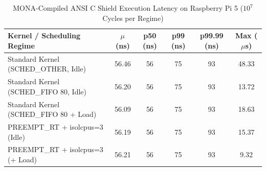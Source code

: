 \begin{table}[t]
\centering
\caption{MONA-Compiled ANSI C Shield Execution Latency on Raspberry Pi 5 ($10^7$ Cycles per Regime)}
\label{tab:c_shield_rt}
\begin{tabular}{lccccc}
\toprule
\textbf{Kernel / Scheduling Regime} & \textbf{$\mu$ (ns)} & \textbf{p50 (ns)} & \textbf{p99 (ns)} & \textbf{p99.99 (ns)} & \textbf{Max ($\mu$s)} \\
\midrule
Standard Kernel (SCHED\_OTHER, Idle) & 56.46 & 56 & 75 & 93 & 48.33 \\
Standard Kernel (SCHED\_FIFO 80, Idle) & 56.20 & 56 & 75 & 93 & 13.72 \\
Standard Kernel (SCHED\_FIFO 80 + Load) & 56.09 & 56 & 75 & 93 & 18.63 \\
PREEMPT\_RT + isolcpus=3 (Idle) & 56.19 & 56 & 75 & 93 & 15.37 \\
PREEMPT\_RT + isolcpus=3 (+ Load) & 56.21 & 56 & 75 & 93 & 9.32 \\
\bottomrule
\end{tabular}
\end{table}
